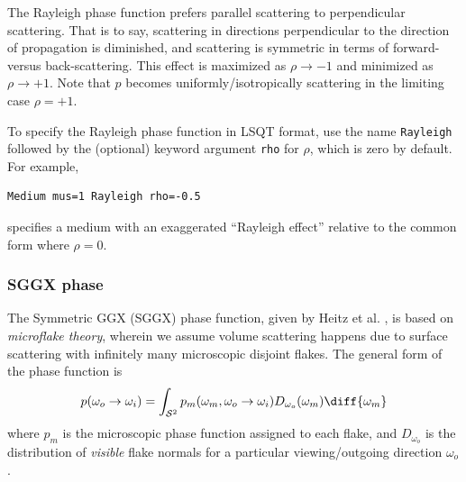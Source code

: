 \documentclass[
    twoside,
    twocolumn,
    letterpaper,
    10pt]{article}
\newcommand\namett[2]{{\color{code#1}\texttt{#2}}}
\begin{document}
The Rayleigh phase function prefers parallel scattering
to perpendicular scattering. That is to say, scattering in directions 
perpendicular to the direction of propagation is diminished, and scattering 
is symmetric in terms of forward- versus back-scattering. This effect is 
maximized as $\rho \to -1$ and minimized as $\rho \to +1$. Note that $p$ 
becomes uniformly/isotropically scattering in the limiting case $\rho = +1$.

To specify the Rayleigh phase function in LSQT format, use the name 
\namett{purple}{Rayleigh} followed by the (optional) keyword argument
\texttt{rho} for $\rho$, which is zero by default. For example,
\begin{lstlisting}
Medium mus=1 Rayleigh rho=-0.5
\end{lstlisting}
specifies a medium with an exaggerated ``Rayleigh effect'' relative to the
common form where $\rho=0$.

\subsubsection{SGGX phase}
\label{sec:doc-media-sggx}

The Symmetric GGX (SGGX) phase function, given by 
Heitz et al. \cite{Heitz:15}, is based on \emph{microflake
theory}, wherein we assume volume scattering happens due to surface 
scattering with infinitely many microscopic disjoint flakes. 
The general form of the phase function is 
\begin{equation*}
    p(\omega_o \to \omega_i) = 
    \int_{\mathcal{S}^2} p_m(\omega_m, \omega_o \to \omega_i) 
    D_{\omega_o}(\omega_m) \diff{\omega_m}
\end{equation*}
where $p_m$ is the microscopic phase function 
assigned to each flake, and $D_{\omega_o}$ is the distribution of
\emph{visible} flake normals for a particular viewing/outgoing direction 
$\omega_o$.
\end{document}
